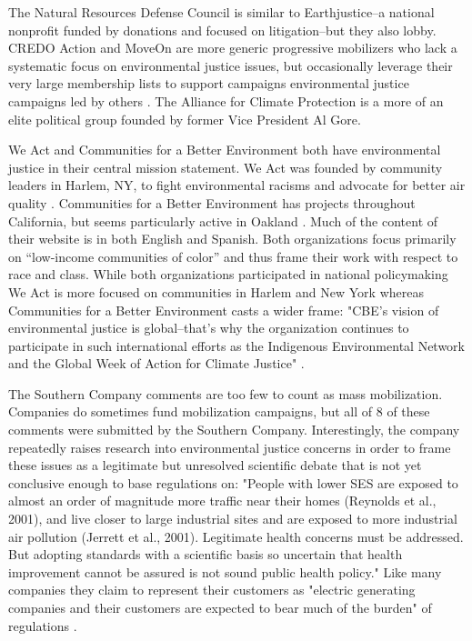  The Natural Resources Defense Council is similar to Earthjustice--a national nonprofit funded by donations and focused on litigation--but they also lobby. CREDO Action and MoveOn are more generic progressive mobilizers who lack a systematic focus on environmental justice issues, but occasionally leverage their very large membership lists to support campaigns environmental justice campaigns led by others \citep{MoveOn.org2017,CREDO2017}. The Alliance for Climate Protection is a more of an elite political group founded by former Vice President Al Gore. 
 
 We Act and Communities for a Better Environment both have environmental justice in their central mission statement. We Act was founded by community leaders in Harlem, NY, to fight environmental racisms and advocate for better air quality \citep{WEACT2017}. Communities for a Better Environment has projects throughout California, but seems particularly active in Oakland \citep{CBECAL2017CommunitiesEnvironment}. Much of the content of their website is in both English and Spanish. Both organizations focus primarily on ``low-income communities of color'' and thus frame their work with respect to race and class. While both organizations participated in national policymaking We Act is more focused on communities in Harlem and New York whereas Communities for a Better Environment casts a wider frame: "CBE’s vision of environmental justice is global--that’s why the organization continues to participate in such international efforts as the Indigenous Environmental Network and the Global Week of Action for Climate Justice" \citep{CBECAL2017}.
 
 The Southern Company comments are too few to count as mass mobilization. Companies do sometimes fund mobilization campaigns, but all of 8 of these comments were submitted by the Southern Company. Interestingly, the company repeatedly raises research into environmental justice concerns in order to frame these issues as a legitimate but unresolved scientific debate that is not yet conclusive enough to base regulations on: "People with lower SES are exposed to almost an order of magnitude more traffic near their homes (Reynolds et al., 2001), and live closer to large industrial sites and are exposed to more industrial air pollution (Jerrett et al., 2001). Legitimate health concerns must be addressed. But adopting standards with a scientific basis so uncertain that health improvement cannot be assured is not sound public health policy." Like many companies they claim to represent their customers as "electric generating companies and their customers are expected to bear much of the burden" of regulations \citep{Hobson2004}.
 
